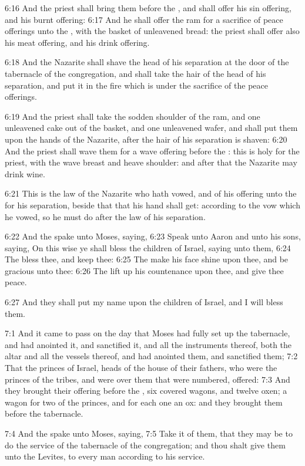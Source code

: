 6:16 And the priest shall bring them before the \LORD, and shall offer his sin offering, and his burnt offering: 6:17 And he shall offer the ram for a sacrifice of peace offerings unto the \LORD, with the basket of unleavened bread: the priest shall offer also his meat offering, and his drink offering.

6:18 And the Nazarite shall shave the head of his separation at the door of the tabernacle of the congregation, and shall take the hair of the head of his separation, and put it in the fire which is under the sacrifice of the peace offerings.

6:19 And the priest shall take the sodden shoulder of the ram, and one unleavened cake out of the basket, and one unleavened wafer, and shall put them upon the hands of the Nazarite, after the hair of his separation is shaven: 6:20 And the priest shall wave them for a wave offering before the \LORD: this is holy for the priest, with the wave breast and heave shoulder: and after that the Nazarite may drink wine.

6:21 This is the law of the Nazarite who hath vowed, and of his offering unto the \LORD for his separation, beside that that his hand shall get: according to the vow which he vowed, so he must do after the law of his separation.

6:22 And the \LORD spake unto Moses, saying, 6:23 Speak unto Aaron and unto his sons, saying, On this wise ye shall bless the children of Israel, saying unto them, 6:24 The \LORD bless thee, and keep thee: 6:25 The \LORD make his face shine upon thee, and be gracious unto thee: 6:26 The \LORD lift up his countenance upon thee, and give thee peace.

6:27 And they shall put my name upon the children of Israel, and I will bless them.

7:1 And it came to pass on the day that Moses had fully set up the tabernacle, and had anointed it, and sanctified it, and all the instruments thereof, both the altar and all the vessels thereof, and had anointed them, and sanctified them; 7:2 That the princes of Israel, heads of the house of their fathers, who were the princes of the tribes, and were over them that were numbered, offered: 7:3 And they brought their offering before the \LORD, six covered wagons, and twelve oxen; a wagon for two of the princes, and for each one an ox: and they brought them before the tabernacle.

7:4 And the \LORD spake unto Moses, saying, 7:5 Take it of them, that they may be to do the service of the tabernacle of the congregation; and thou shalt give them unto the Levites, to every man according to his service.

